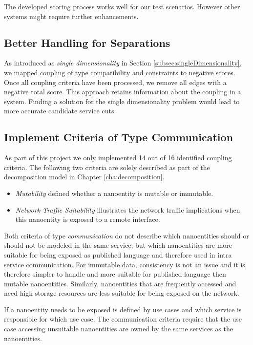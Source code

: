 The developed scoring process works well for our test scenarios. However other systems might require further enhancements.

\subsection{Better Handling for Separations}
\label{sec:handling-for-separations}

As introduced as \textit{single dimensionality} in Section \ref{subsec:singleDimensionality}, we mapped coupling of type compatibility and constraints to negative scores. Once all coupling criteria have been processed, we remove all edges with a negative total score. This approach retains information about the coupling in a system. Finding a solution for the single dimensionality problem would lead to more accurate candidate service cuts.

\subsection{Implement Criteria of Type Communication}

As part of this project we only implemented 14 out of 16 identified coupling criteria. The following two criteria are solely described as part of the decomposition model in Chapter \ref{cha:decomposition}.

\begin{itemize}
\item \textit{Mutability} defined whether a nanoentity is mutable or immutable.
\item \textit{Network Traffic Suitability} illustrates the network traffic implications when this nanoentity is exposed to a remote interface.
\end{itemize}

Both criteria of type \textit{communication} do not describe which nanoentities should or should not be modeled in the same service, but which nanoentities are more suitable for being exposed as published language and therefore used in intra service communication. For immutable data, consistency is not an issue and it is therefore simpler to handle and more suitable for published language then mutable nanoentities. Similarly, nanoentities that are frequently accessed and need high storage resources are less suitable for being exposed on the network. 

If a nanoentity needs to be exposed is defined by use cases and which service is responsible for which use case. The communication criteria require that the use case accessing unsuitable nanoentities are owned by the same services as the nanoentities.

